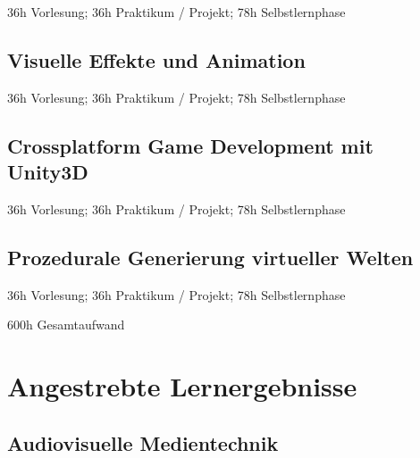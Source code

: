 36h Vorlesung; 36h Praktikum / Projekt; 78h Selbstlernphase

\subsection*{Visuelle Effekte und
Animation\label{/mi-2017/modulbeschreibungen-bachelor/BA_Vertiefung-Visual-Computing}}\label{visuelle-effekte-und-animationpathlabelmi-2017modulbeschreibungen-bachelorbaux5fvertiefung-visual-computing}

36h Vorlesung; 36h Praktikum / Projekt; 78h Selbstlernphase

\subsection*{Crossplatform Game Development mit
Unity3D\label{/mi-2017/modulbeschreibungen-bachelor/BA_Vertiefung-Visual-Computing}}\label{crossplatform-game-development-mit-unity3dpathlabelmi-2017modulbeschreibungen-bachelorbaux5fvertiefung-visual-computing}

36h Vorlesung; 36h Praktikum / Projekt; 78h Selbstlernphase

\subsection*{Prozedurale Generierung virtueller
Welten\label{/mi-2017/modulbeschreibungen-bachelor/BA_Vertiefung-Visual-Computing}}\label{prozedurale-generierung-virtueller-weltenpathlabelmi-2017modulbeschreibungen-bachelorbaux5fvertiefung-visual-computing}

36h Vorlesung; 36h Praktikum / Projekt; 78h Selbstlernphase

600h Gesamtaufwand

\section*{Angestrebte
Lernergebnisse\label{/mi-2017/modulbeschreibungen-bachelor/BA_Vertiefung-Visual-Computing}}\label{angestrebte-lernergebnissepathlabelmi-2017modulbeschreibungen-bachelorbaux5fvertiefung-visual-computing}

\subsection*{Audiovisuelle
Medientechnik\label{/mi-2017/modulbeschreibungen-bachelor/BA_Vertiefung-Visual-Computing}}\label{audiovisuelle-medientechnikpathlabelmi-2017modulbeschreibungen-bachelorbaux5fvertiefung-visual-computing-1}

